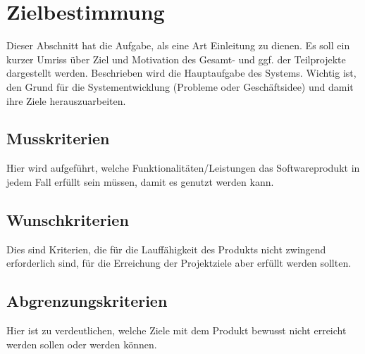 
\chapter{Zielbestimmung}

Dieser Abschnitt hat die Aufgabe, als eine Art Einleitung zu dienen. Es soll
ein kurzer Umriss über Ziel und Motivation des Gesamt- und ggf. der
Teilprojekte dargestellt werden. Beschrieben wird die Hauptaufgabe des Systems.
Wichtig ist, den Grund für die Systementwicklung (Probleme oder Geschäftsidee)
und damit ihre Ziele herauszuarbeiten.
\section{Musskriterien}

Hier wird aufgeführt, welche Funktionalitäten/Leistungen das Softwareprodukt in
jedem Fall erfüllt sein müssen, damit es genutzt werden kann.
\section{Wunschkriterien}
Dies sind Kriterien, die für die Lauffähigkeit des Produkts nicht zwingend
erforderlich sind, für die Erreichung der Projektziele aber erfüllt werden
sollten.

\section{Abgrenzungskriterien}
Hier ist zu verdeutlichen, welche Ziele mit dem Produkt bewusst nicht erreicht
werden sollen oder werden können.
